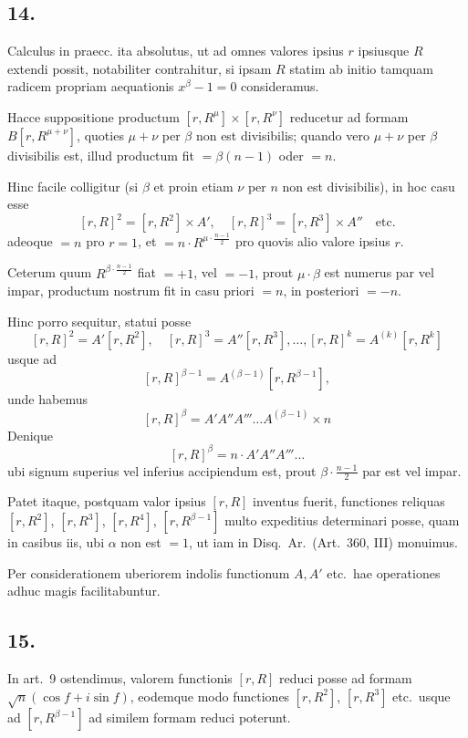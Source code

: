 \documentclass[12pt,a4paper]{article}
\begin{document}
\subsection*{14.}

Calculus in praecc. ita absolutus, ut ad omnes valores ipsius $r$ ipsiusque $R$ extendi possit, notabiliter contrahitur, si ipsam $R$ statim ab initio tamquam radicem propriam aequationis $x^\beta-1=0$ consideramus.

Hacce suppositione productum $[r,R^\mu] \times [r,R^\nu]$ reducetur ad formam $B[r, R^{\mu+\nu}]$, quoties $\mu+\nu$ per $\beta$ non est divisibilis; quando vero $\mu+\nu$ per $\beta$ divisibilis est, illud productum fit $=\beta(n-1)$ oder $=n$.

Hinc facile colligitur (si $\beta$ et proin etiam $\nu$ per $n$ non est divisibilis), in hoc casu esse
\[
[r,R]^2 = [r,R^2] \times A', \quad [r,R]^3 = [r,R^3] \times A'' \quad\text{etc.}
\]
adeoque $=n$ pro $r=1$, et $=n \cdot R^{\mu\cdot\frac{n-1}{2}}$ pro quovis alio valore ipsius $r$.

Ceterum quum $R^{\beta\cdot\frac{n-1}{2}}$ fiat $=+1$, vel $=-1$, prout $\mu\cdot\beta$ est numerus par vel impar, productum nostrum fit in casu priori $=n$, in posteriori $=-n$.

Hinc porro sequitur, statui posse
\[
[r,R]^2 = A'[r,R^2], \quad [r,R]^3 = A''[r,R^3], \ldots, [r,R]^k = A^{(k)}[r,R^k]
\]
usque ad
\[
[r,R]^{\beta-1} = A^{(\beta-1)}[r, R^{\beta-1}],
\]
unde habemus
\[
[r,R]^\beta = A' A'' A''' \ldots A^{(\beta-1)} \times n
\]
Denique
\[
[r,R]^\beta = n \cdot A' A'' A''' \ldots
\]
ubi signum superius vel inferius accipiendum est, prout $\beta\cdot\frac{n-1}{2}$ par est vel impar.

Patet itaque, postquam valor ipsius $[r,R]$ inventus fuerit, functiones reliquas $[r,R^2]$, $[r,R^3]$, $[r,R^4]$, $[r,R^{\beta-1}]$ multo expeditius determinari posse, quam in casibus iis, ubi $\alpha$ non est $=1$, ut iam in Disq.\ Ar.\ (Art.\ 360, III) monuimus.

Per considerationem uberiorem indolis functionum $A, A'$ etc.\ hae operationes adhuc magis facilitabuntur.

\subsection*{15.}

In art.\ 9 ostendimus, valorem functionis $[r,R]$ reduci posse ad formam $\sqrt{n}(\cos f + i\sin f)$, eodemque modo functiones $[r,R^2]$, $[r,R^3]$ etc.\ usque ad $[r, R^{\beta-1}]$ ad similem formam reduci poterunt.
\end{document}

